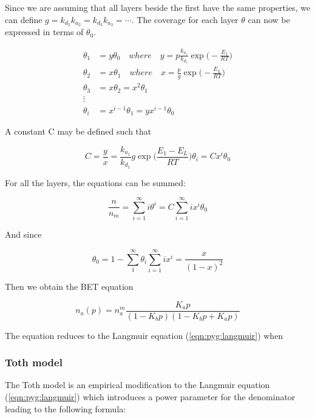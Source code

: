 Since we are assuming that all layers beside the first have the same properties,
we can define \(g= {k_{d_2}}{k_{a_2}} = {k_{d_3}}{k_{a_3}} = \cdots\).
The coverage for each layer \(\theta\) can now be expressed in terms of \(\theta_0\).

\begin{align}
    \theta_1 &= y \theta_0 \quad where \quad y = p \frac{k_{a_1}}{k_{d_1}} \exp{\Big(-\frac{E_1}{RT}\Big)} \\
    \theta_2 &= x \theta_1 \quad where \quad x = \frac{p}{g} \exp{\Big(-\frac{E_L}{RT}\Big)} \\
    \theta_3 &= x \theta_2 = x^2 \theta_1 \\
    \vdots \nonumber \\
    \theta_i &= x^{i-1} \theta_1 = y x^{i-1} \theta_0
\end{align}

A constant C may be defined such that

\begin{equation}
    C = \frac{y}{x} = \frac{k_{a_1}}{k_{d_1}} g \exp{\Big(\frac{E_1 - E_L}{RT}\Big)}
    \theta_i = C x^i \theta_0
\end{equation}

For all the layers, the equations can be summed:

\begin{equation}
    \frac{n}{n_m} = \sum_{i=1}^{\infty} i \theta^i = C \sum_{i=1}^{\infty} i x^i \theta_0
\end{equation}

And since

\begin{equation}
    \theta_0 = 1 - \sum_{1}^{\infty} \theta_i
    \sum_{i=1}^{\infty} i x^i = \frac{x}{(1-x)^2}
\end{equation}

Then we obtain the BET equation

\begin{equation}\label{eqn:pyg:bet}
    n_a(p) = n_a^m \frac{K_a p}{(1-K_b p)(1-K_b p+ K_a p)}
\end{equation}

The equation reduces to the Langmuir equation (\ref{eqn:pyg:langmuir}) when

\subsubsection{Toth model}

The Toth model is an empirical modification to the Langmuir equation
(\ref{eqn:pyg:langmuir})
which introduces a power parameter for the denominator leading to
the following formula:

